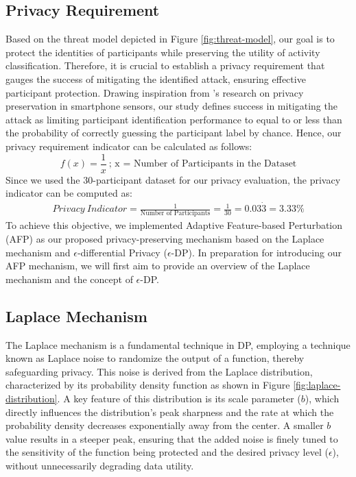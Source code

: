 \documentclass{l4proj}
\begin{document}
\subsection{Privacy Requirement} \label{privacy_requirement}
Based on the threat model depicted in Figure \ref{fig:threat-model}, our goal is to protect the identities of participants while preserving the utility of activity classification. Therefore, it is crucial to establish a privacy requirement that gauges the success of mitigating the identified attack, ensuring effective participant protection. Drawing inspiration from \cite{differential_privacy_with_weighted_privacy_preservation}'s research on privacy preservation in smartphone sensors, our study defines success in mitigating the attack as limiting participant identification performance to equal to or less than the probability of correctly guessing the participant label by chance. Hence, our privacy requirement indicator can be calculated as follows: 
\begin{equation}
    f(x) = \frac{1}{x}\: \text{; x = Number of Participants in the Dataset}
    \label{eq:privacy_requirement_indicator}
\end{equation}
Since we used the 30-participant dataset for our privacy evaluation, the privacy indicator can be computed as:
\begin{align*}
    Privacy\: Indicator = \frac{1}{\text{Number of Participants}} = \frac{1}{30} = 0.03\dot{3} = 3.33\%
\end{align*}
To achieve this objective, we implemented Adaptive Feature-based Perturbation (AFP) as our proposed privacy-preserving mechanism based on the Laplace mechanism and $\epsilon$-differential Privacy ($\epsilon$-DP). In preparation for introducing our AFP mechanism, we will first aim to provide an overview of the Laplace mechanism and the concept of $\epsilon$-DP.

\subsection{Laplace Mechanism}
The Laplace mechanism is a fundamental technique in DP, employing a technique known as Laplace noise to randomize the output of a function, thereby safeguarding privacy. This noise is derived from the Laplace distribution, characterized by its probability density function as shown in Figure \ref{fig:laplace-distribution}. A key feature of this distribution is its scale parameter ($b$), which directly influences the distribution's peak sharpness and the rate at which the probability density decreases exponentially away from the center. A smaller $b$ value results in a steeper peak, ensuring that the added noise is finely tuned to the sensitivity of the function being protected and the desired privacy level ($\epsilon$), without unnecessarily degrading data utility.
\end{document}
